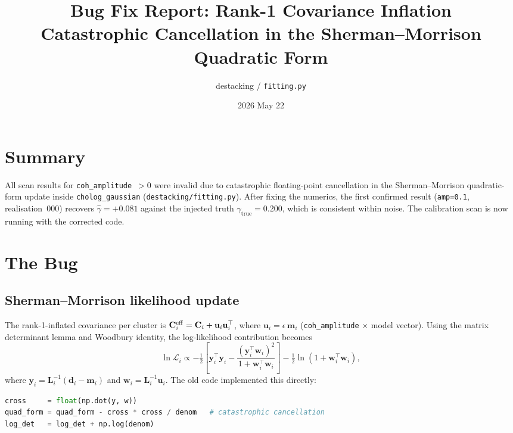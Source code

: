 \documentclass[11pt, a4paper]{article}
\title{\textbf{Bug Fix Report: Rank-1 Covariance Inflation}\\[0.4em]
       \large Catastrophic Cancellation in the Sherman--Morrison Quadratic Form}
\author{destacking / \texttt{fitting.py}}
\date{2026 May 22}
\begin{document}
\maketitle

\section*{Summary}

All scan results for \texttt{coh\_amplitude}~$>0$ were invalid due to
catastrophic floating-point cancellation in the Sherman--Morrison
quadratic-form update inside \texttt{cholog\_gaussian}
(\texttt{destacking/fitting.py}).
After fixing the numerics, the first confirmed result
(\texttt{amp=0.1}, realisation~000) recovers
$\hat\gamma = +0.081$ against the injected truth $\gamma_\mathrm{true}=0.200$,
which is consistent within noise.
The calibration scan is now running with the corrected code.

\section{The Bug}

\subsection{Sherman--Morrison likelihood update}

The rank-1-inflated covariance per cluster is
$\mathbf{C}_i^{\rm eff} = \mathbf{C}_i + \mathbf{u}_i\mathbf{u}_i^\top$,
where $\mathbf{u}_i = \epsilon\,\mathbf{m}_i$ (\texttt{coh\_amplitude}
$\times$ model vector).
Using the matrix determinant lemma and Woodbury identity, the
log-likelihood contribution becomes
\begin{equation}
    \ln\mathcal{L}_i \propto
    -\tfrac{1}{2}\left[\mathbf{y}_i^\top\mathbf{y}_i
    - \frac{(\mathbf{y}_i^\top\mathbf{w}_i)^2}{1+\mathbf{w}_i^\top\mathbf{w}_i}
    \right]
    - \tfrac{1}{2}\ln(1+\mathbf{w}_i^\top\mathbf{w}_i),
\end{equation}
where $\mathbf{y}_i = \mathbf{L}_i^{-1}(\mathbf{d}_i - \mathbf{m}_i)$ and
$\mathbf{w}_i = \mathbf{L}_i^{-1}\mathbf{u}_i$.
The old code implemented this directly:

\begin{lstlisting}[language=Python]
cross     = float(np.dot(y, w))
quad_form = quad_form - cross * cross / denom   # catastrophic cancellation
log_det   = log_det + np.log(denom)
\end{lstlisting}
\end{document}
